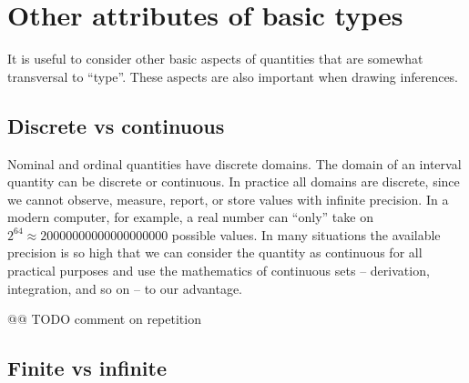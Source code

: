 \documentclass[
  a4paper,
  DIV=11,
  numbers=noendperiod,
  oneside]{scrreprt}
\begin{document}

\hypertarget{other-attributes-of-basic-types}{%
\section{Other attributes of basic
types}\label{other-attributes-of-basic-types}}

It is useful to consider other basic aspects of quantities that are
somewhat transversal to ``type''. These aspects are also important when
drawing inferences.

\hypertarget{discrete-vs-continuous}{%
\subsection{Discrete vs continuous}\label{discrete-vs-continuous}}

Nominal and ordinal quantities have discrete domains. The domain of an
interval quantity can be discrete or continuous. In practice all domains
are discrete, since we cannot observe, measure, report, or store values
with infinite precision. In a modern computer, for example, a real
number can ``only'' take on
\(2^{64} \approx 20 000 000 000 000 000 000\) possible values. In many
situations the available precision is so high that we can consider the
quantity as continuous for all practical purposes and use the
mathematics of continuous sets -- derivation, integration, and so on --
to our advantage.

@@ TODO comment on repetition

\hypertarget{finite-vs-infinite}{%
\subsection{Finite vs infinite}\label{finite-vs-infinite}}
\end{document}
